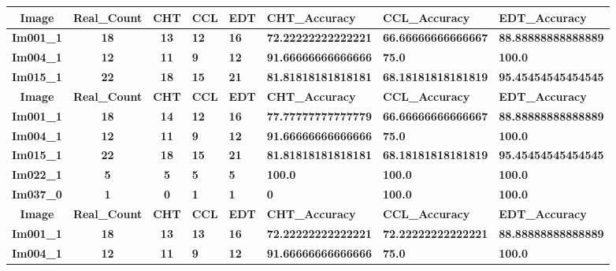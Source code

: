 \begin{table}[H]
\centering
\begin{tabular}{|c|c|c|}
\hline
 \textbf{Image} & \textbf{Real\_Count} & \textbf{CHT} & \textbf{CCL} & \textbf{EDT} & \textbf{CHT\_Accuracy} & \textbf{CCL\_Accuracy} & \textbf{EDT\_Accuracy} \\ \hline
 \textbf{Im001\_1} & \textbf{18} & \textbf{13} & \textbf{12} & \textbf{16} & \textbf{72.22222222222221} & \textbf{66.66666666666667} & \textbf{88.88888888888889} \\ \hline
 \textbf{Im004\_1} & \textbf{12} & \textbf{11} & \textbf{9} & \textbf{12} & \textbf{91.66666666666666} & \textbf{75.0} & \textbf{100.0} \\ \hline
 \textbf{Im015\_1} & \textbf{22} & \textbf{18} & \textbf{15} & \textbf{21} & \textbf{81.81818181818181} & \textbf{68.18181818181819} & \textbf{95.45454545454545} \\ \hline
 \textbf{Image} & \textbf{Real\_Count} & \textbf{CHT} & \textbf{CCL} & \textbf{EDT} & \textbf{CHT\_Accuracy} & \textbf{CCL\_Accuracy} & \textbf{EDT\_Accuracy} \\ \hline
 \textbf{Im001\_1} & \textbf{18} & \textbf{14} & \textbf{12} & \textbf{16} & \textbf{77.77777777777779} & \textbf{66.66666666666667} & \textbf{88.88888888888889} \\ \hline
 \textbf{Im004\_1} & \textbf{12} & \textbf{11} & \textbf{9} & \textbf{12} & \textbf{91.66666666666666} & \textbf{75.0} & \textbf{100.0} \\ \hline
 \textbf{Im015\_1} & \textbf{22} & \textbf{18} & \textbf{15} & \textbf{21} & \textbf{81.81818181818181} & \textbf{68.18181818181819} & \textbf{95.45454545454545} \\ \hline
 \textbf{Im022\_1} & \textbf{5} & \textbf{5} & \textbf{5} & \textbf{5} & \textbf{100.0} & \textbf{100.0} & \textbf{100.0} \\ \hline
 \textbf{Im037\_0} & \textbf{1} & \textbf{0} & \textbf{1} & \textbf{1} & \textbf{0} & \textbf{100.0} & \textbf{100.0} \\ \hline
 \textbf{Image} & \textbf{Real\_Count} & \textbf{CHT} & \textbf{CCL} & \textbf{EDT} & \textbf{CHT\_Accuracy} & \textbf{CCL\_Accuracy} & \textbf{EDT\_Accuracy} \\ \hline
 \textbf{Im001\_1} & \textbf{18} & \textbf{13} & \textbf{13} & \textbf{16} & \textbf{72.22222222222221} & \textbf{72.22222222222221} & \textbf{88.88888888888889} \\ \hline
 \textbf{Im004\_1} & \textbf{12} & \textbf{11} & \textbf{9} & \textbf{12} & \textbf{91.66666666666666} & \textbf{75.0} & \textbf{100.0} \\ \hline

\end{tabular}
\end{table}
